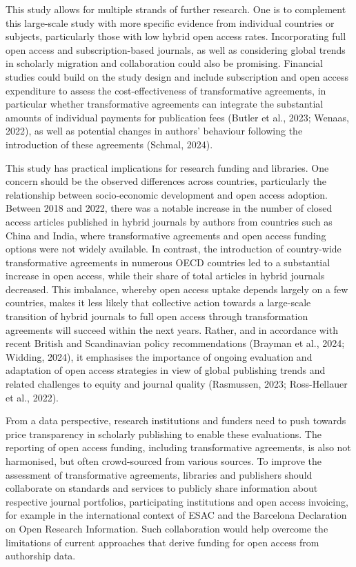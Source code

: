 \documentclass[a4paper,man,floatsintext,longtable,noextraspace,12pt]{apa6}
\begin{document}
This study allows for multiple strands of further research. One is to
complement this large-scale study with more specific evidence from
individual countries or subjects, particularly those with low hybrid
open access rates. Incorporating full open access and subscription-based
journals, as well as considering global trends in scholarly migration
and collaboration could also be promising. Financial studies could build
on the study design and include subscription and open access expenditure
to assess the cost-effectiveness of transformative agreements, in
particular whether transformative agreements can integrate the
substantial amounts of individual payments for publication fees (Butler
et al., 2023; Wenaas, 2022), as well as potential changes in authors'
behaviour following the introduction of these agreements (Schmal, 2024).

This study has practical implications for research funding and
libraries. One concern should be the observed differences across
countries, particularly the relationship between socio-economic
development and open access adoption. Between 2018 and 2022, there was a
notable increase in the number of closed access articles published in
hybrid journals by authors from countries such as China and India, where
transformative agreements and open access funding options were not
widely available. In contrast, the introduction of country-wide
transformative agreements in numerous OECD countries led to a
substantial increase in open access, while their share of total articles
in hybrid journals decreased. This imbalance, whereby open access uptake
depends largely on a few countries, makes it less likely that collective
action towards a large-scale transition of hybrid journals to full open
access through transformation agreements will succeed within the next
years. Rather, and in accordance with recent British and Scandinavian
policy recommendations (Brayman et al., 2024; Widding, 2024), it
emphasises the importance of ongoing evaluation and adaptation of open
access strategies in view of global publishing trends and related
challenges to equity and journal quality (Rasmussen, 2023; Ross-Hellauer
et al., 2022).

From a data perspective, research institutions and funders need to push
towards price transparency in scholarly publishing to enable these
evaluations. The reporting of open access funding, including
transformative agreements, is also not harmonised, but often
crowd-sourced from various sources. To improve the assessment of
transformative agreements, libraries and publishers should collaborate
on standards and services to publicly share information about respective
journal portfolios, participating institutions and open access
invoicing, for example in the international context of ESAC and the
Barcelona Declaration on Open Research Information. Such collaboration
would help overcome the limitations of current approaches that derive
funding for open access from authorship data.
\end{document}
